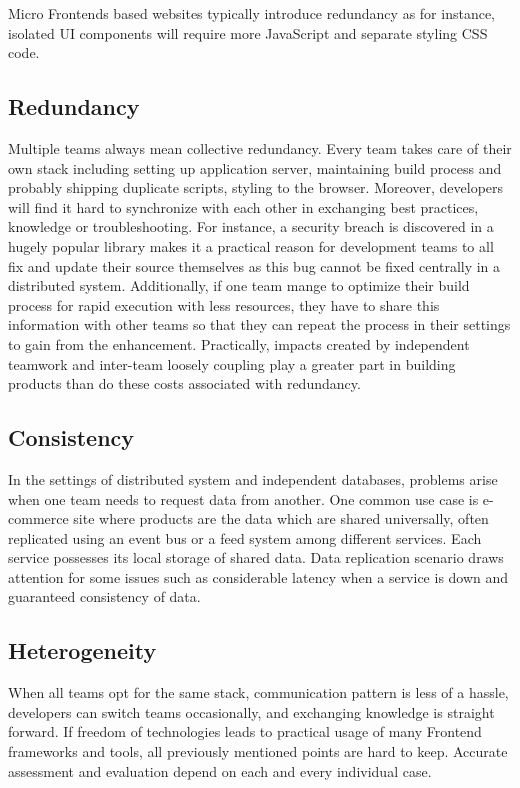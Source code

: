 \documentclass[a4paper]{book}
\begin{document}
Micro Frontends based websites typically introduce redundancy as for instance, isolated UI components will require more JavaScript and separate styling CSS code.

\subsection{Redundancy}

Multiple teams always mean collective redundancy. Every team takes care of their own stack including setting up application server, maintaining build process and probably shipping duplicate scripts, styling to the browser. Moreover, developers will find it hard to synchronize with each other in exchanging best practices, knowledge or troubleshooting. For instance, a security breach is discovered in a hugely popular library makes it a practical reason for development teams to all fix and update their source themselves as this bug cannot be fixed centrally in a distributed system. Additionally, if one team mange to optimize their build process for rapid execution with less resources, they have to share this information with other teams so that they can repeat the process in their settings to gain from the enhancement. Practically, impacts created by independent teamwork and inter-team loosely coupling play a greater part in building products than do these costs associated with redundancy. \cite{Gee20}

\subsection{Consistency}
 
In the settings of distributed system and independent databases, problems arise when one team needs to request data from another. One common use case is e-commerce site where products are the data which are shared universally, often replicated using an event bus or a feed system among different services. Each service possesses its local storage of shared data. Data replication scenario draws attention for some issues such as considerable latency when a service is down and guaranteed consistency of data. \cite{Gee20}

\subsection{Heterogeneity}

When all teams opt for the same stack, communication pattern is less of a hassle, developers can switch teams occasionally, and exchanging knowledge is straight forward. If freedom of technologies leads to practical usage of many Frontend frameworks and tools, all previously mentioned points are hard to keep. Accurate assessment and evaluation depend on each and every individual case. \cite{Gee20}
\end{document}
